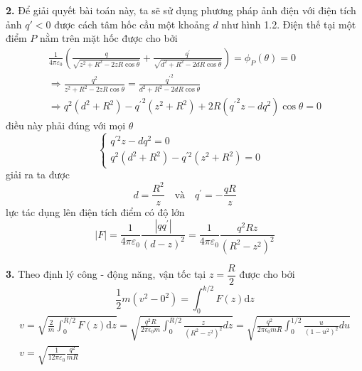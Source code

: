 \noindent\textbf{2.} Để giải quyết bài toán này, ta sẽ sử dụng phương pháp ảnh điện với điện tích ảnh $q'<0$ được cách tâm hốc cầu một khoảng $d$ như hình 1.2. Điện thế tại một điểm $P$ nằm trên mặt hốc được cho bởi
\begin{equation*}
  \begin{gathered}
    \frac{1}{4\pi\varepsilon_{0}}\left(\frac{q}{\sqrt{z^{2}+R^{2}-2zR\cos\theta}}+\frac{q^{\prime}}{\sqrt{d^{2}+R^{2}-2dR\cos\theta}}\right)=\phi_{P}(\theta)=0 \\
    \Rightarrow\frac{q^{2}}{z^{2}+R^{2}-2zR\cos\theta}=\frac{{q^{\prime}}^{2}}{d^{2}+R^{2}-2dR\cos\theta} \\
    \Rightarrow q^{2}(d^{2}+R^{2})-{q^{\prime}}^{2}(z^{2}+R^{2})+2R({q^{\prime}}^{2}z-dq^{2})\cos\theta=0
  \end{gathered}
\end{equation*}
điều này phải đúng với mọi $\theta$
\begin{equation*}
  \begin{cases}
    q^{\prime2}z-dq^2=0                     \\
    q^2(d^2+R^2)-{q^{\prime2}}(z^2+R^2)=0 &
  \end{cases}
\end{equation*}
giải ra ta được
\begin{equation*}
  d=\frac{R^2}{z}\quad\text{và}\quad q^{\prime}=-\frac{qR}{z}
\end{equation*}
lực tác dụng lên điện tích điểm có độ lớn
\begin{equation*}
  |F|=\frac{1}{4\pi\varepsilon_{0}}\frac{|qq^{\prime}|}{(d-z)^{2}}=\frac{1}{4\pi\varepsilon_{0}}\frac{q^{2}Rz}{(R^{2}-z^{2})^{2}}
\end{equation*}

\noindent\textbf{3.} Theo định lý công - động năng, vận tốc tại $z=\dfrac{R}{2}$ được cho bởi
\begin{equation*}
  \frac{1}{2}m(v^{2}-0^{2})=\int_{0}^{k/2}F(z)\mathrm{d}z
\end{equation*}
\begin{equation*}
  \begin{gathered}
    v=\sqrt{\frac{2}{m}\int_{0}^{R/2}F(z)\mathrm{d}z}=\sqrt{\frac{q^{2}R}{2\pi\epsilon_{0}m}\int_{0}^{R/2}\frac{z}{(R^{2}-z^{2})^{2}}dz}=\sqrt{\frac{q^{2}}{2\pi\epsilon_{0}mR}\int_{0}^{1/2}\frac{u}{(1-u^{2})^{2}}du}\\
    v=\sqrt{\frac{1}{12\pi\varepsilon_{0}}\frac{q^{2}}{mR}}
  \end{gathered}
\end{equation*}
